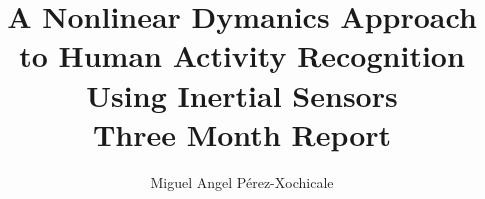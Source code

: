 \documentclass[letterpaper,times,numbered,print,custommargin]{Classes/PhDThesisPSnPDF}
\title{
A Nonlinear Dymanics Approach \\
to Human Activity Recognition \\
Using Inertial Sensors
\\
\vspace{5mm}
\Large{Three Month Report }\\
}
\author{Miguel Angel P\'erez-Xochicale}
\begin{document}
\frontmatter


\begin{titlepage}
\maketitle
\end{titlepage}

% 

% 


\mainmatter




\begin{spacing}{0.9}

% 

\cleardoublepage


\end{spacing}


\begin{appendices} %
% 
\end{appendices}

\printthesisindex %
\end{document}
